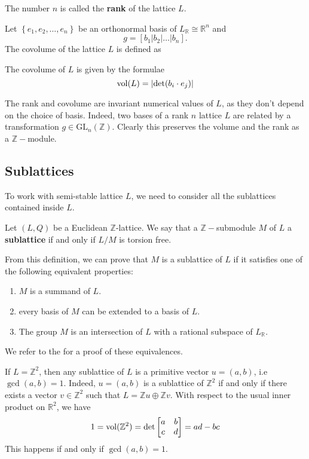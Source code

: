 The number $n$ is called the \textbf{rank} of the lattice $L$.

Let $\left\lbrace e_1,e_2,\ldots,e_n \right\rbrace$ be an orthonormal basis of $L_\mathbb{R} \cong \mathbb{R}^n$ and
\[g = [b_1 | b_2 | \ldots | b_n] .\] The covolume of the lattice
$L$ is defined as
\begin{definition}
    The covolume of $L$ is given by the formulae
    \[\operatorname{vol}(L) = \left|\det(b_i\cdot e_j)\right|\]
\end{definition}
The rank and covolume are invariant numerical values of $L$, as they don't depend on the choice of basis. Indeed, two bases of a rank $n$ lattice $L$
are related by a transformation $g \in \text{GL}_n(\mathbb{Z})$. Clearly this preserves the volume and the rank as a $\mathbb{Z}-$module.


\subsection{Sublattices}
To work with semi-stable lattice $L$, we need to consider all the sublattices contained inside $L$.
\begin{definition}[\label=sublattice]
    Let $(L,Q)$ be a Euclidean $\mathbb{Z}$-lattice. We say that a $\mathbb{Z}-$submodule $M$ of
    $L$ a \textbf{sublattice} if and only if $L/M$ is torsion free.
\end{definition}
From this definition, we can prove that $M$ is a sublattice of $L$ if it satisfies one of the
following equivalent properties:
\begin{enumerate}
    \item $M$ is a summand of $L$.
    \item every basis of $M$ can be extended to a basis of $L$.
    \item The group $M$ is an intersection of $L$ with a rational subspace of $L_\mathbb{R}$.
\end{enumerate}
We refer to the \cite{} for a proof of these equivalences.
\begin{example}
    If $L = \mathbb{Z}^2$, then any sublattice of $L$ is a primitive vector $u = (a,b)$, i.e
    $\gcd(a,b)=1$. Indeed, $u=(a,b)$ is a sublattice of $\mathbb{Z}^2$ if and only if there exists a vector $v \in \mathbb{Z}^2$
    such that $L = \mathbb{Z}u \oplus \mathbb{Z}v$. With respect to the usual inner product on $\mathbb{R}^2$,
    we have
    \[1 = \operatorname{vol}(\mathbb{Z}^2) = \det \begin{bmatrix}
            a & b \\
            c & d
        \end{bmatrix} = ad-bc\]
    This happens if and only if $\gcd(a,b)=1$.
\end{example}

